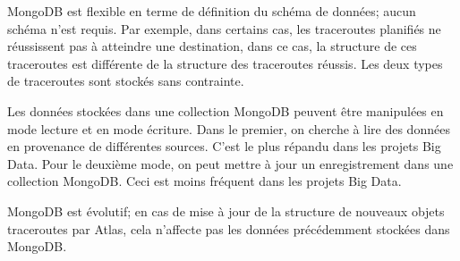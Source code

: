 MongoDB est flexible en terme de définition du schéma de données; aucun schéma n'est requis.   Par exemple, dans certains cas, les traceroutes planifiés ne réussissent pas à atteindre une destination, dans ce cas, la structure de ces  traceroutes est différente  de la structure des traceroutes réussis. Les deux types de traceroutes sont stockés sans contrainte.

Les données stockées dans une collection MongoDB peuvent être manipulées en mode lecture et en mode écriture. Dans le premier, on cherche à lire des données en provenance de différentes sources. C'est le plus répandu dans les projets Big Data. Pour le deuxième mode, on peut mettre à jour un enregistrement dans une collection MongoDB. Ceci est moins fréquent dans les projets Big Data.

 
 MongoDB est évolutif; en cas de   mise à jour de la structure de nouveaux  objets traceroutes par Atlas,  cela n'affecte pas les données précédemment  stockées  dans MongoDB.
 




